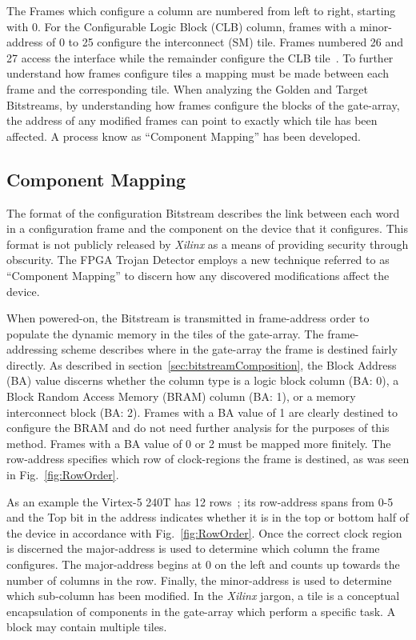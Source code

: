 \documentclass[journal, hidelinks]{IEEEtran}
\begin{document}
The Frames which configure a column are numbered from left to right, starting with 0.  
For the Configurable Logic Block (CLB) column, frames with a minor-address of 0 to 25 configure the interconnect (SM) tile.
Frames numbered 26 and 27 access the interface while the remainder configure the CLB tile~\cite{virtex5ConfigGuide}.
To further understand how frames configure tiles a mapping must be made between each frame and the corresponding tile.
When analyzing the Golden and Target Bitstreams, by understanding how frames configure the blocks of the gate-array, the address of any modified frames can point to exactly which tile has been affected.
A process know as ``Component Mapping'' has been developed. 

\subsection{Component Mapping} \label{sec:tileMapping}
The format of the configuration Bitstream describes the link between each word in a configuration frame and the component on the device that it configures. 
This format is not publicly released by \textit{Xilinx} as a means of providing security through obscurity.
The FPGA Trojan Detector employs a new technique referred to as ``Component Mapping'' to discern how any discovered modifications affect the device.

When powered-on, the Bitstream is transmitted in frame-address order to populate the dynamic memory in the tiles of the gate-array.
The frame-addressing scheme describes where in the gate-array the frame is destined fairly directly.
As described in section~\ref{sec:bitstreamComposition}, the Block Address (BA) value discerns whether the column type is a logic block column (BA: 0), a Block Random Access Memory (BRAM) column (BA: 1), or a memory interconnect block (BA: 2).
Frames with a BA value of 1 are clearly destined to configure the BRAM and do not need further analysis for the purposes of this method.
Frames with a BA value of 0 or 2 must be mapped more finitely.
The row-address specifies which row of clock-regions the frame is destined, as was seen in Fig.~\ref{fig:RowOrder}.

As an example the Virtex-5 240T has 12 rows~\cite{virtex5ConfigGuide}; its row-address spans from 0-5 and the Top bit in the address indicates whether it is in the top or bottom half of the device in accordance with Fig.~\ref{fig:RowOrder}.
Once the correct clock region is discerned the major-address is used to determine which column the frame configures.
The major-address begins at 0 on the left and counts up towards the number of columns in the row.
Finally, the minor-address is used to determine which sub-column has been modified.
In the \textit{Xilinx} jargon, a tile is a conceptual encapsulation of components in the gate-array which perform a specific task.
A block may contain multiple tiles.
\end{document}

